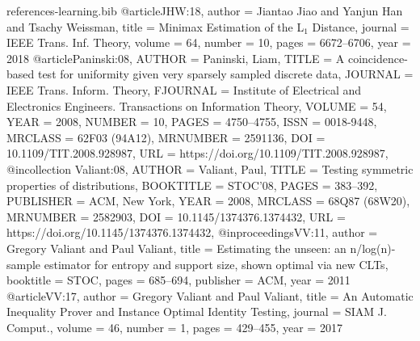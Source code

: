 \documentclass[11pt]{article}
\begin{document}
\begin{filecontents}{references-learning.bib}
@article{JHW:18,
  author    = {Jiantao Jiao and
               Yanjun Han and
               Tsachy Weissman},
  title     = {Minimax Estimation of the L\({}_{\mbox{1}}\) Distance},
  journal   = {{IEEE} Trans. Inf. Theory},
  volume    = {64},
  number    = {10},
  pages     = {6672--6706},
  year      = {2018}
}
@article{Paninski:08,
    AUTHOR = {Paninski, Liam},
     TITLE = {A coincidence-based test for uniformity given very sparsely
              sampled discrete data},
   JOURNAL = {IEEE Trans. Inform. Theory},
  FJOURNAL = {Institute of Electrical and Electronics Engineers.
              Transactions on Information Theory},
    VOLUME = {54},
      YEAR = {2008},
    NUMBER = {10},
     PAGES = {4750--4755},
      ISSN = {0018-9448},
   MRCLASS = {62F03 (94A12)},
  MRNUMBER = {2591136},
       DOI = {10.1109/TIT.2008.928987},
       URL = {https://doi.org/10.1109/TIT.2008.928987},
}
@incollection {Valiant:08,
    AUTHOR = {Valiant, Paul},
     TITLE = {Testing symmetric properties of distributions},
 BOOKTITLE = {S{TOC}'08},
     PAGES = {383--392},
 PUBLISHER = {ACM, New York},
      YEAR = {2008},
   MRCLASS = {68Q87 (68W20)},
  MRNUMBER = {2582903},
       DOI = {10.1145/1374376.1374432},
       URL = {https://doi.org/10.1145/1374376.1374432},
}
@inproceedings{VV:11,
  author    = {Gregory Valiant and
               Paul Valiant},
  title     = {Estimating the unseen: an n/log(n)-sample estimator for entropy and
               support size, shown optimal via new CLTs},
  booktitle = {{STOC}},
  pages     = {685--694},
  publisher = {{ACM}},
  year      = {2011}
}
@article{VV:17,
  author    = {Gregory Valiant and
               Paul Valiant},
  title     = {An Automatic Inequality Prover and Instance Optimal Identity Testing},
  journal   = {{SIAM} J. Comput.},
  volume    = {46},
  number    = {1},
  pages     = {429--455},
  year      = {2017}
}
\end{filecontents}

 
\end{document}

